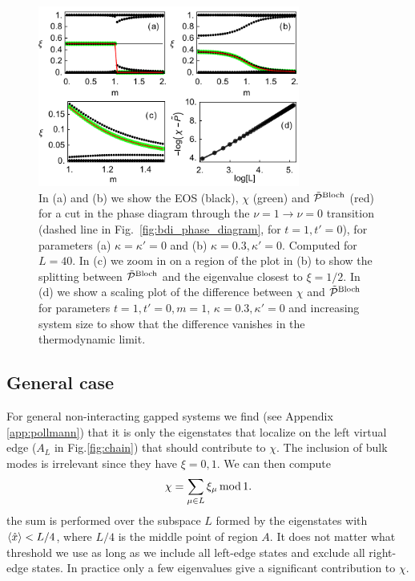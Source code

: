 \documentclass[twocolumn,amsmath,longbibliography,amssymb,superscriptaddress]{revtex4-1}
\begin{document}
\begin{figure}[t]
\centering
\includegraphics[width=86mm]{fig3comp.pdf}
\caption{In (a) and (b)  we show the EOS (black), $\chi$ (green) and $\tilde{\mathcal{P}}^{\rm Bloch}$ (red) for a cut in the phase diagram through the $\nu = 1 \rightarrow \nu = 0$ transition (dashed line in Fig.~\ref{fig:bdi_phase_diagram}, for $t = 1,t'=0$), for parameters  (a) $\kappa =\kappa'=0$ and (b) $\kappa = 0.3, \kappa'=0$. Computed for $L=40$. In (c) we zoom in on a region of the plot in (b) to show the splitting between $\tilde{\mathcal{P}}^{\rm Bloch}$ and the eigenvalue closest to $\xi=1/2$. In (d) we show a scaling plot of the difference between $\chi$ and $\tilde{\mathcal{P}}^{\rm Bloch}$ for parameters $t=1,t'=0,m=1$, $\kappa = 0.3, \kappa'=0$ and increasing system size to show that the difference vanishes in the thermodynamic limit. }
\label{huang}
\end{figure}

\subsection{General case}

For general non-interacting gapped systems we find (see Appendix \ref{app:pollmann}) that it is only the eigenstates that localize on the left virtual edge ($A_L$ in Fig.\ref{fig:chain}) that should contribute to $\chi$. The inclusion of bulk modes is irrelevant since they have $\xi = 0,1$. We can then compute
\begin{equation}
\chi = \sum_{\mu \in L} \xi_\mu \, {\rm mod} \, 1. 
\label{eq:chi_left}
\end{equation}
the sum is performed over the subspace $L$ formed by the eigenstates with $\expval{\hat{x}}<L/4$, where $L/4$ is the middle point of region $A$. It does not matter what threshold we use as long as we include all left-edge states and exclude all right-edge states. In practice only a few eigenvalues give a significant contribution to $\chi$. 
\end{document}
